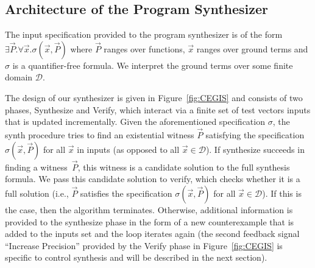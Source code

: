 \documentclass[final]{sig-alternate-05-2015}
\newcommand{\red}[1]{{\color{red}#1}}
\begin{document}


\subsection{Architecture of the Program Synthesizer}
\label{synthesizer-general}
%
% 
The input specification provided to the program synthesizer is of the form
$\exists \vec{P} .  \forall \vec{x}.  \sigma(\vec{x}, \vec{P})$ where
$\vec{P}$ ranges over functions, $\vec{x}$ ranges over ground terms and
$\sigma$ is a quantifier-free formula.  We interpret the ground terms over
some finite domain $\mathcal{D}$.

The design of our synthesizer is given in Figure~\ref{fig:CEGIS} and consists
of two phases, {\sc Synthesize} and {\sc Verify}, which interact via a
finite set of test vectors {\sc inputs} that is updated incrementally. 
Given the aforementioned specification $\sigma$, the {\sc synth} procedure
tries to find an existential witness $\vec{P}$ satisfying the specification
$\sigma(\vec{x}, \vec{P})$ for all $\vec{x}$ in {\sc inputs} (as opposed to
all $\vec{x} \in \mathcal{D}$).
%
If {\sc synthesize} succeeds in finding a witness~$\vec{P}$, this witness
is a candidate solution to the full synthesis formula.  We pass this
candidate solution to {\sc verify}, which checks whether it is a full
solution (i.e., $\vec{P}$ satisfies the specification $\sigma(\vec{x},
\vec{P})$ for all $\vec{x}\in\mathcal{D}$).
%
%
%
If this is the case, then the algorithm terminates.  Otherwise, additional
information is provided to the {\sc synthesize} phase in the form of a new
counterexample that is added to the {\sc inputs} set and the loop iterates
again (the second feedback signal ``Increase Precision'' provided by the
{\sc Verify} phase in Figure~\ref{fig:CEGIS} is specific to control
synthesis and will be described in the next section).
\end{document}
